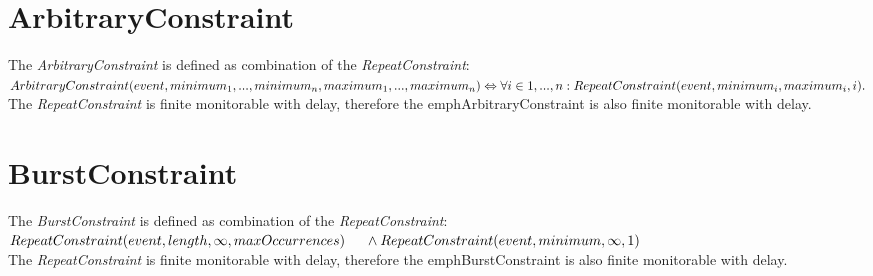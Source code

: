 	
\section{ArbitraryConstraint}
	The \emph{ArbitraryConstraint} is defined as combination of the \emph{RepeatConstraint}:\\[10pt]
	\begin{math}
		ArbitraryConstraint(event, minimum_1, ..., minimum_n, maximum_1, ..., maximum_n)\\
		\Leftrightarrow \forall i\in{1, ..., n}: RepeatConstraint(event, minimum_i, maximum_i, i).
	\end{math}\\[10pt]
	The \emph{RepeatConstraint} is finite monitorable with delay, therefore the emph{ArbitraryConstraint} is also finite monitorable with delay.
	
\section{BurstConstraint}
	The \emph{BurstConstraint} is defined as combination of the \emph{RepeatConstraint}:\\[10pt]
	\begin{math}
		RepeatConstraint(event, length, \infty, maxOccurrences)\\
		\text{\hspace{.5cm}}\land RepeatConstraint(event, minimum, \infty, 1)
	\end{math}\\[10pt]
	The \emph{RepeatConstraint} is finite monitorable with delay, therefore the emph{BurstConstraint} is also finite monitorable with delay.
	
